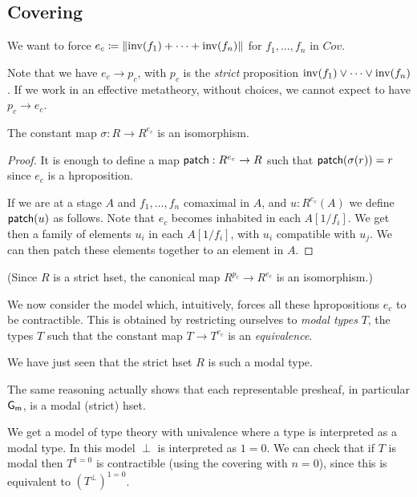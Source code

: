 \subsection{Covering}

We want to force $e_c \coloneqq \left\lVert \mathrm{inv}(f_1)+\dots+\mathrm{inv}(f_n) \right\rVert$ for $f_1,\dots,f_n$ in $Cov$.

Note that we have $e_c\rightarrow p_c$, with $p_c$ is the {\em strict} proposition $\mathrm{inv}(f_1)\vee \dots\vee\mathrm{inv}(f_n)$.
If we work in an effective metatheory, without choices, we cannot expect to have $p_c\rightarrow e_c$.

\begin{lemma}
  The constant map $\sigma:R\rightarrow R^{e_c}$ is an isomorphism.
\end{lemma}

\begin{proof}
  It is enough to define a map $\mathsf{patch}:R^{e_c}\rightarrow R$ such that $\mathsf{patch}(\sigma(r)) = r$ since
  $e_c$ is a hproposition.

  If we are at a stage $A$ and $f_1,\dots,f_n$ comaximal in $A$, and $u:R^{e_c}(A)$ we define $\mathsf{patch}(u)$ as follows.
  Note that $e_c$ becomes inhabited in each $A[1/f_i]$. We get then a family of elements $u_i$ in each $A[1/f_i]$, with $u_i$ compatible
  with $u_j$. We can then patch these elements together to an element in $A$.
\end{proof}

(Since $R$ is a strict hset, the canonical map $R^{p_c}\rightarrow R^{e_c}$ is an isomorphism.)

We now consider the model which, intuitively, forces all these hpropositions $e_c$ to be contractible.
This is obtained by restricting ourselves to {\em modal types} $T$, the types
$T$ such that the constant map $T\rightarrow T^{e_c}$ is an {\em equivalence}.

\medskip

We have just seen that the strict hset $R$ is such a modal type.

The same reasoning actually shows that each representable presheaf, in particular $\mathsf{G_m}$, is a modal
(strict) hset.

\medskip

We get a model of type theory with univalence where a type is interpreted as a modal type.
In this model $\perp$ is interpreted as $1=0$. We can check that if $T$ is modal then
$T^{1=0}$ is contractible (using the covering with $n=0$), since this is equivalent to $(T^{\perp})^{1=0}$.

